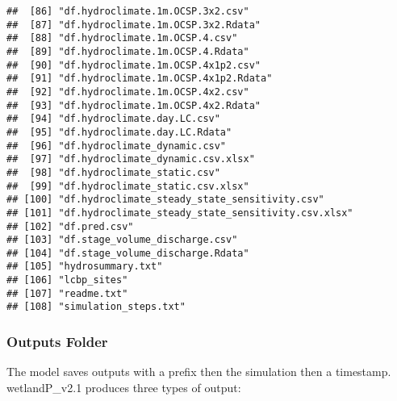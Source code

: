 \documentclass[
]{article}
\begin{document}
\begin{verbatim}
##  [86] "df.hydroclimate.1m.OCSP.3x2.csv"                  
##  [87] "df.hydroclimate.1m.OCSP.3x2.Rdata"                
##  [88] "df.hydroclimate.1m.OCSP.4.csv"                    
##  [89] "df.hydroclimate.1m.OCSP.4.Rdata"                  
##  [90] "df.hydroclimate.1m.OCSP.4x1p2.csv"                
##  [91] "df.hydroclimate.1m.OCSP.4x1p2.Rdata"              
##  [92] "df.hydroclimate.1m.OCSP.4x2.csv"                  
##  [93] "df.hydroclimate.1m.OCSP.4x2.Rdata"                
##  [94] "df.hydroclimate.day.LC.csv"                       
##  [95] "df.hydroclimate.day.LC.Rdata"                     
##  [96] "df.hydroclimate_dynamic.csv"                      
##  [97] "df.hydroclimate_dynamic.csv.xlsx"                 
##  [98] "df.hydroclimate_static.csv"                       
##  [99] "df.hydroclimate_static.csv.xlsx"                  
## [100] "df.hydroclimate_steady_state_sensitivity.csv"     
## [101] "df.hydroclimate_steady_state_sensitivity.csv.xlsx"
## [102] "df.pred.csv"                                      
## [103] "df.stage_volume_discharge.csv"                    
## [104] "df.stage_volume_discharge.Rdata"                  
## [105] "hydrosummary.txt"                                 
## [106] "lcbp_sites"                                       
## [107] "readme.txt"                                       
## [108] "simulation_steps.txt"
\end{verbatim}

\hypertarget{outputs-folder}{%
\subsubsection{Outputs Folder}\label{outputs-folder}}

The model saves outputs with a prefix then the simulation then a
timestamp. wetlandP\_v2.1 produces three types of output:
\end{document}
